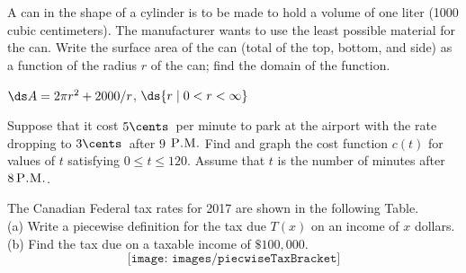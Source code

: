 \begin{enumialphparenastyle}
\begin{multicols}{2}
\begin{ex}
A can in the shape of a cylinder is to be made to hold a
volume of one liter (1000 cubic centimeters). The manufacturer wants
to use the least possible material for the can. Write the surface area
of the can (total of the top, bottom, and side) as a function of the
radius $r$ of the can; find the domain of the function.
\begin{sol}
$\ds A=2\pi r^2+2000/r$, $\ds \{r\mid 0<r<\infty\}$
\end{sol}
\end{ex}

\begin{ex}
Suppose that it cost $\displaystyle{5 \cents \,}$ per minute to park at the airport with the rate dropping to $\displaystyle{3 \cents \,}$ after $9$ $\textsc{P.M.}$ Find and graph the cost function $c(t)$ for values of $t$ satisfying $0 \leq t \leq 120$. Assume that $t$ is the number of minutes after $8 \, \textsc{P.M.}$. 	
\end{ex}

\begin{ex}
The Canadian Federal tax rates for 2017 are shown in the following Table. \\

(a) Write a piecewise definition for the tax due $T(x)$ on an income of $x$ dollars. 	\\
(b) Find the tax due on a taxable income of $\$100,000$. \\

\vspace{-1cm}
$$\texttt{[image: images/piecwiseTaxBracket]}$$
\end{ex}


\end{multicols}

\end{enumialphparenastyle}

\pagebreak
